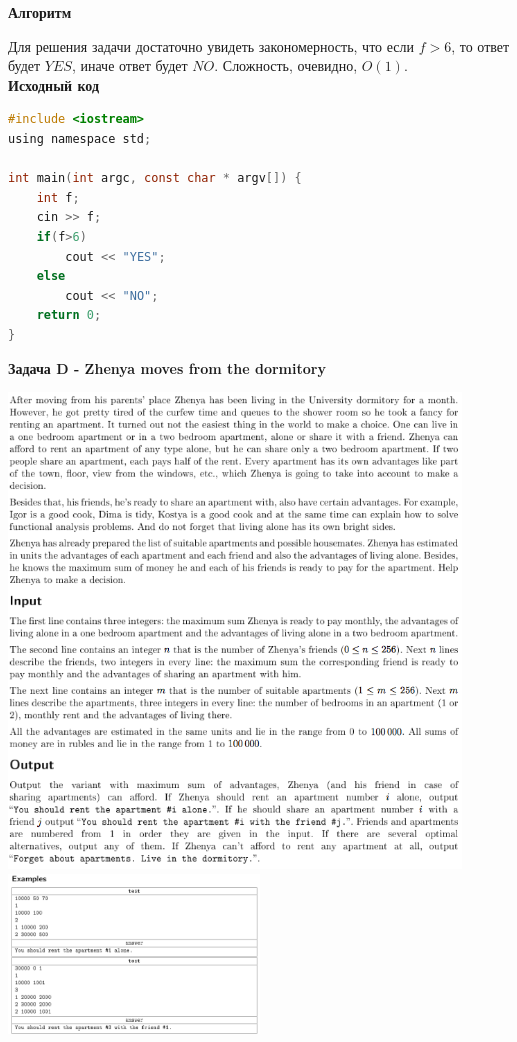 \documentclass[a4paper,12pt]{article}
\begin{document}
\textbf{{\large Алгоритм}}

Для решения задачи достаточно увидеть закономерность, что если $f > 6$, то ответ будет $YES$, иначе ответ будет $NO$. Сложность, очевидно, $O(1)$.\\

\textbf{{\large Исходный код}} \\
\begin{lstlisting}[language=C]
#include <iostream>
using namespace std;

int main(int argc, const char * argv[]) {
    int f;
    cin >> f;
    if(f>6)
        cout << "YES";
    else
        cout << "NO";
    return 0;
}
\end{lstlisting}

\newpage
\textbf{{\large Задача D - Zhenya moves from the dormitory}}

\begin{center}
\includegraphics[width=0.9\textwidth]{CT_ACM_EAST/CT_ACM_EAST_D1.png}\\ [1cm]
\includegraphics[width=0.5\textwidth]{CT_ACM_EAST/CT_ACM_EAST_D2.png}\\ [1cm]
\end{center}
\end{document}
